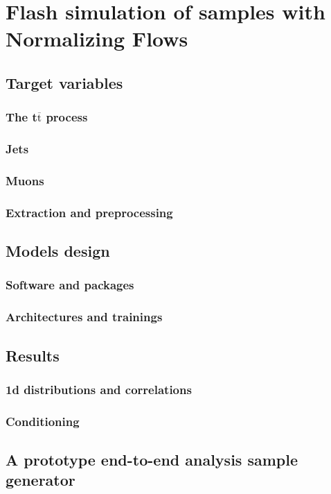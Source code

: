 \chapter{Flash simulation of samples with Normalizing Flows}\label{ch:fs} %

\section{Target variables}

\subsection{The t$\overline{\text{t}}$ process}

\subsection{Jets}

\subsection{Muons}

\subsection{Extraction and preprocessing}

\section{Models design}

\subsection{Software and packages}

\subsection{Architectures and trainings}

\section{Results}

\subsection{1d distributions and correlations}

\subsection{Conditioning}

\section{A prototype end-to-end analysis sample generator}
